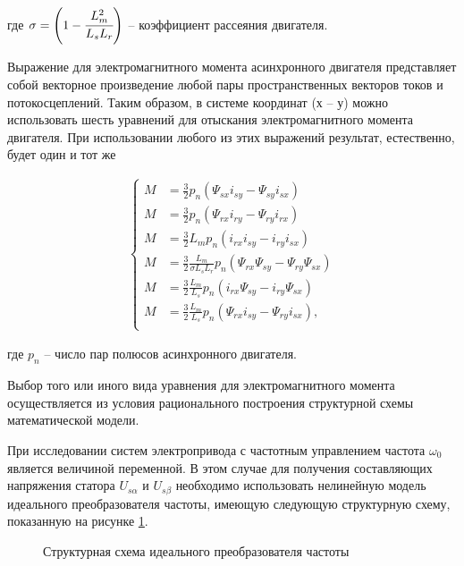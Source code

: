         где $\sigma=\left(1-\cfrac{L_m^2}{L_s L_r}\right)$ -- коэффициент
        рассеяния двигателя.

        Выражение для электромагнитного момента асинхронного двигателя
        представляет собой векторное произведение любой пары пространственных
        векторов токов и потокосцеплений. Таким образом, в системе координат (х
        – у) можно использовать шесть уравнений для отыскания электромагнитного
        момента двигателя. При использовании любого из этих выражений
        результат, естественно, будет один и тот же
        
        \begin{gather*}
            \left\{
            \begin{aligned}
                M & =\frac{3}{2}p_n(\Psi_{sx}i_{sy}-\Psi_{sy}i_{sx})\\
                M & =\frac{3}{2}p_n(\Psi_{rx}i_{ry}-\Psi_{ry}i_{rx})\\
                M & =\frac{3}{2}L_m p_n(i_{rx}i_{sy}-i_{ry}i_{sx})\\
                M & =\frac{3}{2}\frac{L_m}{\sigma L_s L_r}
                      p_n(\Psi_{rx}\Psi_{sy}-\Psi_{ry}\Psi_{sx})\\
                M & =\frac{3}{2}\frac{L_m}{L_s}
                      p_n(i_{rx}\Psi_{sy}-i_{ry}\Psi_{sx})\\
                M & =\frac{3}{2}\frac{L_m}{L_s}
                    p_n(\Psi_{rx}i_{sy}-\Psi_{ry}i_{sx}),\\
            \end{aligned}
            \right.
        \end{gather*}
        
        где $p_n$ -- число пар полюсов асинхронного двигателя.

        Выбор того или иного вида уравнения для электромагнитного момента
        осуществляется из условия рационального построения структурной схемы
        математической модели.

        При исследовании систем электропривода с частотным управлением частота
        $\omega_0$ является  величиной переменной. В этом случае для получения
        составляющих напряжения статора $U_{s\alpha}$ и $U_{s\beta}$ необходимо
        использовать нелинейную модель идеального преобразователя частоты,
        имеющую следующую структурную схему, показанную на рисунке
        \ref{fig:inv-struct}.

        \begin{figure}[h!]
            \caption{Структурная схема идеального преобразователя частоты}
            \label{fig:inv-struct}
        \end{figure}

